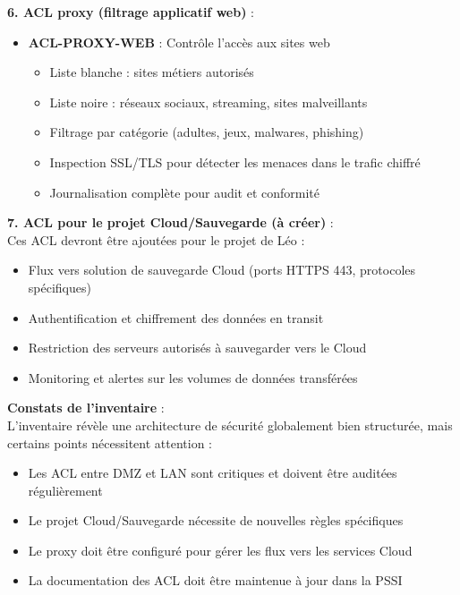 \medskip

\noindent \textbf{6. ACL proxy (filtrage applicatif web)} :\\
\begin{itemize}
  \item \textbf{ACL-PROXY-WEB} : Contrôle l'accès aux sites web
  \begin{itemize}
    \item Liste blanche : sites métiers autorisés
    \item Liste noire : réseaux sociaux, streaming, sites malveillants
    \item Filtrage par catégorie (adultes, jeux, malwares, phishing)
    \item Inspection SSL/TLS pour détecter les menaces dans le trafic chiffré
    \item Journalisation complète pour audit et conformité
  \end{itemize}
\end{itemize}

\medskip

\noindent \textbf{7. ACL pour le projet Cloud/Sauvegarde (à créer)} :\\
Ces ACL devront être ajoutées pour le projet de Léo :
\begin{itemize}
  \item Flux vers solution de sauvegarde Cloud (ports HTTPS 443, protocoles spécifiques)
  \item Authentification et chiffrement des données en transit
  \item Restriction des serveurs autorisés à sauvegarder vers le Cloud
  \item Monitoring et alertes sur les volumes de données transférées
\end{itemize}

\medskip

\noindent \textbf{Constats de l'inventaire} :\\
L'inventaire révèle une architecture de sécurité globalement bien structurée, mais certains points nécessitent attention :
\begin{itemize}
  \item Les ACL entre DMZ et LAN sont critiques et doivent être auditées régulièrement
  \item Le projet Cloud/Sauvegarde nécessite de nouvelles règles spécifiques
  \item Le proxy doit être configuré pour gérer les flux vers les services Cloud
  \item La documentation des ACL doit être maintenue à jour dans la PSSI
\end{itemize}

